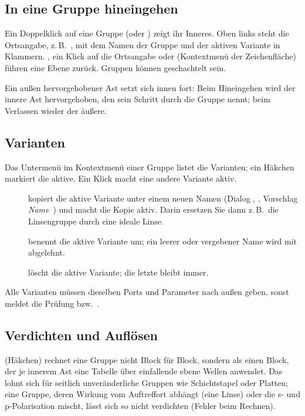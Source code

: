 \subsection{In eine Gruppe hineingehen}

Ein Doppelklick auf eine Gruppe (oder ) zeigt ihr Inneres. Oben links steht die
Ortsangabe, z.\,B.\ , mit
dem Namen der Gruppe und der aktiven Variante in Klammern. , ein Klick auf die
Ortsangabe oder  (Kontextmenü der Zeichenfläche) führen eine Ebene
zurück. Gruppen können geschachtelt sein.

Ein außen hervorgehobener Ast setzt sich innen fort: Beim Hineingehen wird der innere Ast
hervorgehoben, den sein Schritt durch die Gruppe nennt; beim Verlassen wieder der äußere.

\subsection{Varianten}

Das Untermenü  im Kontextmenü einer Gruppe listet die Varianten; ein Häkchen
markiert die aktive. Ein Klick macht eine andere Variante aktiv.

\begin{description}
  \item[] kopiert die aktive Variante unter einem neuen Namen (Dialog
        , , Vorschlag \textit{Name}~)
        und macht die Kopie aktiv. Darin ersetzen Sie dann z.\,B.\ die Linsengruppe durch eine
        ideale Linse.
  \item[] benennt die aktive Variante um; ein leerer oder vergebener Name
        wird mit  abgelehnt.
  \item[] löscht die aktive Variante; die letzte bleibt immer.
\end{description}

Alle Varianten müssen dieselben Ports und Parameter nach außen geben, sonst meldet die Prüfung
 bzw.\ .

\subsection{Verdichten und Auflösen}

 (Häkchen) rechnet eine Gruppe nicht Block für Block, sondern
als einen Block, der je innerem Ast eine Tabelle über einfallende ebene Wellen anwendet. Das
lohnt sich für seitlich unveränderliche Gruppen wie Schichtstapel oder Platten; eine Gruppe,
deren Wirkung vom Auftreffort abhängt (eine Linse) oder die s- und p-Polarisation mischt, lässt
sich so nicht verdichten (Fehler  beim Rechnen).

